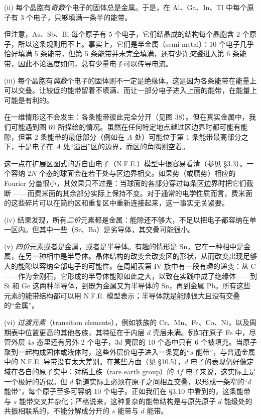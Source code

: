 (ii) 每个晶胞有\emph{奇数}个电子的固体总是金属。于是，在 Al、Ga、In、Tl 中每个原子有 3 个电子，只够填满一条半的能带。

但注意，As、Sb、Bi 每个原子有 5 个电子，它们结晶成的结构每个晶胞含 2 个原子，所以这条规则用不上。事实上，它们是半金属（semi-metal）：10 个电子几乎恰好填满 5 条能带，但第 5 条能带并未完全填满，还有少许\emph{交叠}进入第 6 条能带，因此不论温度如何，总有少量电子可以传导电流。

(iii) 每个晶胞有\emph{偶数}个电子的固体则不一定是绝缘体。这是因为各条能带在能量上可以交叠。让较低的能带留着不填满、而让一部分电子进入上面的能带，在能量上可能是有利的。



在一维情形这不会发生：各条能带彼此完全分开（见图 38）。但在真实金属中，我们可能遇到图 69 所描绘的情况。虽然在任何特定地点越过区边界时都可能有能隙，但第 2 条能带的最低部分（例如在 $A$ 处）可能位于第 1 条能带最高部分之下，于是电子在 $A$ 处“溢出”区的边界，而区的角隅则空着。

这一点在扩展区图式的近自由电子（N.F.E.）模型中很容易看清（参见 §3.3）。一个容纳 $2N$ 个态的球面会在若干处与区边界相交。如果势（或赝势）相应的 Fourier 分量很小，其效果只不过是：当球面的各部分穿过每条区边界时把它们截断
——而费米面的其余部分实际上保持不变。对于通常的电学性质而言，费米面的这些碎片可以在简约区和重复区中重新连接起来，这一事实无关紧要。

(iv) 结果发现，所有\emph{二价}元素都是金属：能隙还不够大，不足以把电子都容纳在单一区内。但其中一些（Sr、Ba）是劣导体，其交叠可能很小。

(v) \emph{四价}元素或者是金属，或者是半导体。有趣的情形是 Sn，它在一种相中是金属，在另一种相中是半导体。晶体结构的改变会改变区的形状，从而改变出现足够大的能隙以容纳全部电子的可能性。在周期表第 IV 族中有一段有趣的递变：从 C——作为金刚石，它形成的半导体能隙如此之大，以致在实践中成了绝缘体——到 Si 和 Ge 这两种半导体，到既为金属又为半导体的 Sn，再到金属 Pb。所有这些元素的能带结构都可以用 N.F.E. 模型表示；半导体就是能隙很大且没有交叠的“金属”。


(vi) \emph{过渡元素}（transition elements），例如铁族的 Cr、Mn、Fe、Co、Ni，以及周期表中位置更高的其他各族，其特征在于内层 $d$ 壳层未满。例如在原子 Fe 中，尽管外层 $4s$ 态里还有另外 2 个电子，$3d$ 壳层的 10 个态中只有 6 个被填充。当原子聚到一起构成固体或液体时，这些外层价电子进入一条宽的“$s$ 能带”，与普通金属中的 N.F.E. 导带没有太大差别。在某些方面（见 §10.5），$d$ 电子的表现仍好像定域在各自的原子实中：对稀土族（rare earth group）的 $4f$ 电子来说，这实际上是一个极好的近似。但 $d$ 轨道实际上必须在原子之间相互交叠，以形成一条窄的“$d$ 能带”，每个原子至多可容纳 10 个电子。正如我们在 §3.10 中看到的，这条能带与 $s$ 能带交叉并杂化；严格说来，这种复杂的能带结构是与原先原子 $d$ 能级处的共振相联系的，不能分解成分开的 $s$ 能带与 $d$ 能带。

